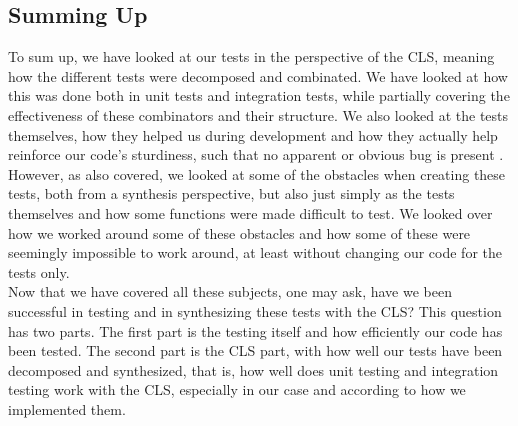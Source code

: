 \subsection{Summing Up} \label{summingUp}
To sum up, we have looked at our tests in the perspective of the CLS, meaning how the different tests were decomposed and combinated. We have looked at how this was done both in unit tests and integration tests, while partially covering the effectiveness of these combinators and their structure. We also looked at the tests themselves, how they helped us during development and how they actually help reinforce our code's sturdiness, such that no apparent or obvious bug is present . However, as also covered, we looked at some of the obstacles when creating these tests, both from a synthesis perspective, but also just simply as the tests themselves and how some functions were made difficult to test. We looked over how we worked around some of these obstacles and how some of these were seemingly impossible to work around, at least without changing our code for the tests only. \\
Now that we have covered all these subjects, one may ask, have we been successful in testing and in synthesizing these tests with the CLS? This question has two parts. The first part is the testing itself and how efficiently our code has been tested. The second part is the CLS part, with how well our tests have been decomposed and synthesized, that is, how well does unit testing and integration testing work with the CLS, especially in our case and according to how we implemented them. \\
\\

